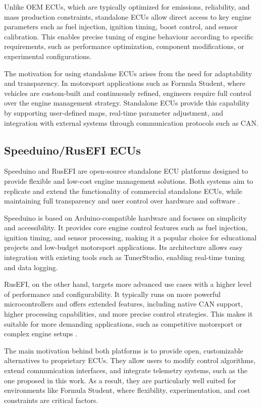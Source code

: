 Unlike OEM ECUs, which are typically optimized for emissions, reliability, and mass production constraints, standalone ECUs allow direct access to key engine parameters such as fuel injection, ignition timing, boost control, and sensor calibration. This enables precise tuning of engine behaviour according to specific requirements, such as performance optimization, component modifications, or experimental configurations.

The motivation for using standalone ECUs arises from the need for adaptability and transparency. In motorsport applications such as Formula Student, where vehicles are custom-built and continuously refined, engineers require full control over the engine management strategy. Standalone ECUs provide this capability by supporting user-defined maps, real-time parameter adjustment, and integration with external systems through communication protocols such as CAN.

\subsection{Speeduino/RusEFI ECUs}

Speeduino and RusEFI are open-source standalone ECU platforms designed to provide flexible and low-cost engine management solutions. Both systems aim to replicate and extend the functionality of commercial standalone ECUs, while maintaining full transparency and user control over hardware and software \cite{rusefi_website}.

Speeduino is based on Arduino-compatible hardware and focuses on simplicity and accessibility. It provides core engine control features such as fuel injection, ignition timing, and sensor processing, making it a popular choice for educational projects and low-budget motorsport applications. Its architecture allows easy integration with existing tools such as TunerStudio, enabling real-time tuning and data logging.

RusEFI, on the other hand, targets more advanced use cases with a higher level of performance and configurability. It typically runs on more powerful microcontrollers and offers extended features, including native CAN support, higher processing capabilities, and more precise control strategies. This makes it suitable for more demanding applications, such as competitive motorsport or complex engine setups \cite{rusefi_github}.

The main motivation behind both platforms is to provide open, customizable alternatives to proprietary ECUs. They allow users to modify control algorithms, extend communication interfaces, and integrate telemetry systems, such as the one proposed in this work. As a result, they are particularly well suited for environments like Formula Student, where flexibility, experimentation, and cost constraints are critical factors.

